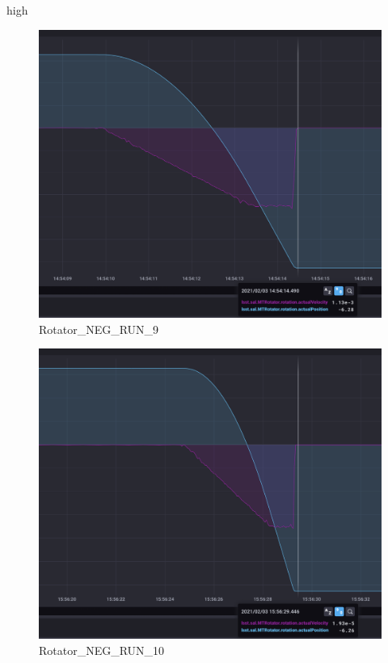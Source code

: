 high\documentclass[SE,lsstdraft,authoryear,toc]{lsstdoc}
\begin{document}
\begin{figure}[h!]
  \includegraphics[width=\linewidth]{media/Rotator_design_speed_neg_test9.png}
  \caption{Rotator\_NEG\_RUN\_9}
  \label{fig:Rotator_NEG_RUN_9}
\end{figure}
\begin{figure}[h!]
  \includegraphics[width=\linewidth]{media/Rotator_design_speed_neg_test10.png}
  \caption{Rotator\_NEG\_RUN\_10}
  \label{fig:Rotator_NEG_RUN_10}
\end{figure}
\end{document}
